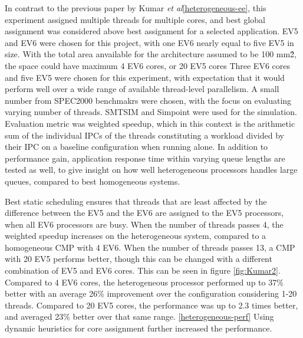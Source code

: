 In contrast to the previous paper by Kumar \textit{et al}\ref{heterogeneous-ee}, this experiment assigned multiple threads for multiple cores, and best global assignment was considered above best assignment for a selected application.
EV5 and EV6 were chosen for this project, with one EV6 nearly equal to five EV5 in size.
With the total area anvailable for the architecture assumed to be 100 mm\^2, the space could have maximum 4 EV6 cores, or 20 EV5 cores
Three EV6 cores and five EV5 were chosen for this experiment, with expectation that it would perform well over a wide range of available thread-level parallelism. 
A small number from SPEC2000 benchmakrs were chosen, with the focus on evaluating varying number of threads.
SMTSIM and Simpoint were used for the simulation.
Evaluation metric was weighted speedup, which in this context is the arithmetic sum of the individual IPCs of the threads constituting a workload divided by their IPC on a baseline configuration when running alone.
In addition to performance gain, application response time within varying queue lengths are tested as well,  to give insight on how well heterogeneous processors handles large queues, compared to best homogeneous systems.

Best static scheduling ensures that threads that are least affected by the difference between the EV5 and the EV6 are assigned to the EV5 processors, when all EV6 processors are busy.
When the number of threads passes 4, the weighted speedup increases on the heterogeneous system, compared to a homogeneous CMP with 4 EV6.
When the number of threads passes 13, a CMP with 20 EV5 performs better, though this can be changed with a different combination of EV5 and EV6 cores.
This can be seen in figure \ref{fig:Kumar2}.
Compared to 4 EV6 cores, the heterogeneous processor performed up to 37\% better with an average 26\% improvement over the configuration considering 1-20 threads. 
Compared to 20 EV5 cores, the performance was up to 2.3 times better, and averaged 23\% better over that same range. \ref{heterogeneous-perf}
Using dynamic heuristics for core assignment further increased the performance.

